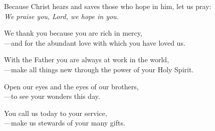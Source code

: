 \intercessions

\begin{raggedright}
Because Christ hears and saves those who hope in him, let us pray:\\
\emph{We praise you, Lord, we hope in you.}

\medskip
We thank you because you are rich in mercy,\\
{\color{red}---}and for the abundant love with which you have loved us.

\medskip
With the Father you are always at work in the world,\\
{\color{red}---}make all things new through the power of your Holy Spirit.

\medskip
Open our eyes and the eyes of our brothers,\\
{\color{red}---}to see your wonders this day.

\medskip
You call us today to your service,\\
{\color{red}---}make us stewards of your many gifts.
\end{raggedright}